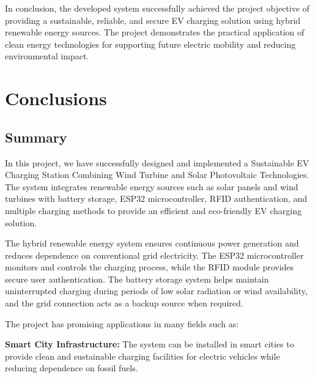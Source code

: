 \documentclass[12pt]{report}
\begin{document}
\begin{Certificatepage}
\begin{center}
\begin{justify}
\vspace{10pt}
\par
In conclusion, the developed system successfully achieved the project objective of providing a sustainable, reliable, and secure EV charging solution using hybrid renewable energy sources. The project demonstrates the practical application of clean energy technologies for supporting future electric mobility and reducing environmental impact.
\vspace{10pt}
\par


\chapter{Conclusions}
\label{chapter5}

\section{Summary}
\label{S1}
\vspace{10pt}
\par
In this project, we have successfully designed and implemented a Sustainable EV Charging Station Combining Wind Turbine and Solar Photovoltaic Technologies. The system integrates renewable energy sources such as solar panels and wind turbines with battery storage, ESP32 microcontroller, RFID authentication, and multiple charging methods to provide an efficient and eco-friendly EV charging solution.

\vspace{10pt}
\par 
The hybrid renewable energy system ensures continuous power generation and reduces dependence on conventional grid electricity. The ESP32 microcontroller monitors and controls the charging process, while the RFID module provides secure user authentication. The battery storage system helps maintain uninterrupted charging during periods of low solar radiation or wind availability, and the grid connection acts as a backup source when required.

\vspace{10pt} 
\par 
The project has promising applications in many fields such as:

\vspace{10pt}
\par 
\textbf{Smart City Infrastructure:} The system can be installed in smart cities to provide clean and sustainable charging facilities for electric vehicles while reducing dependence on fossil fuels.


\end{justify}
\end{center}
\end{Certificatepage}
\end{document}
